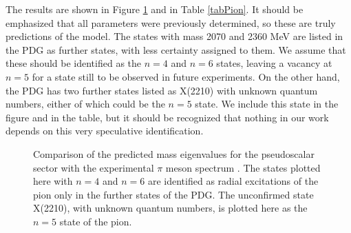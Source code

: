 The results are shown in Figure \ref{figPion} and in Table \ref{tabPion}.  It should be emphasized that all parameters were previously determined, so these are truly predictions of the model.
The states with mass 2070 and 2360 MeV are listed in the PDG as further states, with less certainty assigned to them.
We assume that these should be identified as the $n=4$ and $n=6$ states, leaving a vacancy at $n=5$ for a state still to be observed in future experiments.
On the other hand, the PDG has two further states listed as X(2210) with unknown quantum numbers, either of which could be the $n=5$ state.
We include this state in the figure and in the table, but it should be recognized that nothing in our work depends on this very speculative identification.


\begin{figure}[htb]
\caption{Comparison of the predicted mass eigenvalues for the pseudoscalar sector with the experimental $\pi$ meson spectrum \cite{PDG}.
  The states plotted here with $n=4$ and $n=6$ are identified as radial excitations of the pion only in the further states of the PDG.  
  The unconfirmed state X(2210), with unknown quantum numbers, is plotted here as the $n=5$ state of the pion.}
\label{figPion}
\end{figure}

